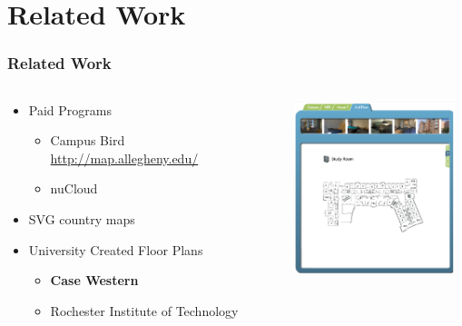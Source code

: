 \documentclass[hyperref={pdfpagelabels=false}]{beamer}
\begin{document}
\section{Related Work}
\hypertarget{Related Work}{{}}
\begin{frame}
\frametitle{Related Work}

\begin{columns}
	 \begin{column}{.45\textwidth}
\begin{itemize}[<+->]
	\item Paid Programs
	\begin{itemize}
		\item Campus Bird \url{http://map.allegheny.edu/}
		\item nuCloud
	\end{itemize}
	\item SVG country maps
	\item University Created Floor Plans
	\begin{itemize}
		\item \textbf{Case Western} 
		\item Rochester Institute of Technology
	\end{itemize}
\end{itemize}	 
\end{column}
	
 \begin{column}{.6\textwidth}
           \includegraphics[height=5cm, width=5.5cm]{CWRUFacilitiesTourFloorPlan.png} 
 
 \end{column}

\end{columns}
\end{frame}
\end{document}
